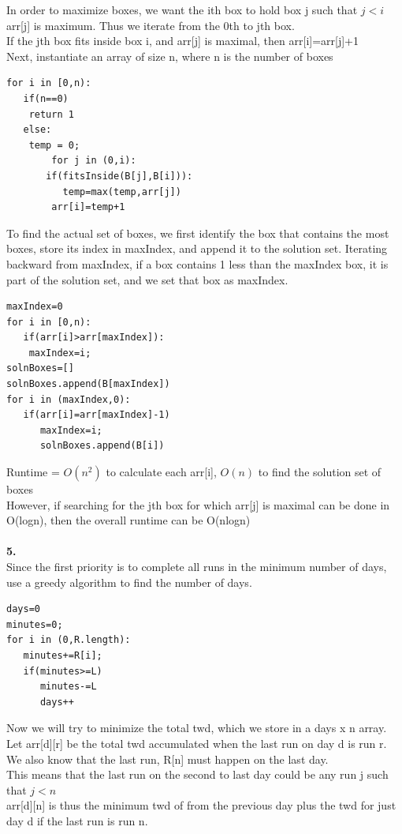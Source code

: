 \documentclass[a4paper,12pt]{article}
\begin{document}
In order to maximize boxes, we want the ith box to hold box j such that $j<i$ arr[j] is maximum. Thus we iterate from the 0th to jth box. \\
If the jth box fits inside box i, and arr[j] is maximal, then arr[i]=arr[j]+1\\
Next, instantiate an array of size n, where n is the number of boxes\\
\begin{lstlisting}
for i in [0,n):
   if(n==0)
	return 1
   else:
	temp = 0;
    	for j in (0,i):
	   if(fitsInside(B[j],B[i])):
	      temp=max(temp,arr[j])
      	arr[i]=temp+1
\end{lstlisting}
To find the actual set of boxes, we first identify the box that contains the most boxes, store its index in maxIndex, and append it to the solution set. Iterating backward from maxIndex, if a box contains 1 less than the maxIndex box, it is part of the solution set, and we set that box as maxIndex. 
\begin{lstlisting}
maxIndex=0
for i in [0,n):
   if(arr[i]>arr[maxIndex]):
	maxIndex=i;
solnBoxes=[]
solnBoxes.append(B[maxIndex])
for i in (maxIndex,0):
   if(arr[i]=arr[maxIndex]-1)
      maxIndex=i;
      solnBoxes.append(B[i])
\end{lstlisting}
Runtime = $O(n^2)$ to calculate each arr[i], $O(n)$ to find the solution set of boxes\\
However, if searching for the jth box for which arr[j] is maximal can be done in O(logn), then the overall runtime can be O(nlogn)\\\\
\noindent \textbf{5.} \\
Since the first priority is to complete all runs in the minimum number of days, use a greedy algorithm to find the number of days. \\
\begin{lstlisting}
days=0
minutes=0;
for i in (0,R.length):
   minutes+=R[i];
   if(minutes>=L)
      minutes-=L
      days++
\end{lstlisting}
Now we will try to minimize the total twd, which we store in a days x n array. Let arr[d][r] be the total twd accumulated when the last run on day d is run r.\\
We also know that the last run, R[n] must happen on the last day.\\
This means that the last run on the second to last day could be any run j such that $j<n$\\
arr[d][n] is thus the minimum twd of from the previous day plus the twd for just day d if the last run is run n. \\
\end{document}
